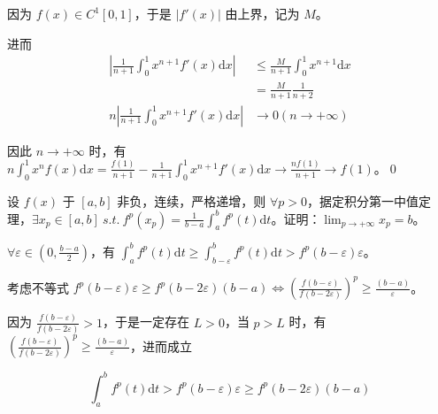 因为 $\displaystyle f( x) \in C^{1}[ 0,1]$，于是 $\displaystyle |f'( x) |$ 由上界，记为 $\displaystyle M$。

进而
\begin{align*}
	\left| \frac{1}{n+1}\int _{0}^{1} x^{n+1} f'( x)\mathrm{d} x\right|  & \leqslant \frac{M}{n+1}\int _{0}^{1} x^{n+1}\mathrm{d} x\\
	& =\frac{M}{n+1}\frac{1}{n+2}\\
	n\left| \frac{1}{n+1}\int _{0}^{1} x^{n+1} f'( x)\mathrm{d} x\right|  & \rightarrow 0\left( n\rightarrow +\infty \right)
\end{align*}


因此 $\displaystyle n\rightarrow +\infty $ 时，有 $\displaystyle n\int _{0}^{1} x^{n} f( x)\mathrm{d} x=\frac{f( 1)}{n+1} -\frac{1}{n+1}\int _{0}^{1} x^{n+1} f'( x)\mathrm{d} x\rightarrow \frac{nf( 1)}{n+1}\rightarrow f( 1)$。\qed 





\begin{ques}
	设 $\displaystyle f( x)$ 于 $\displaystyle [ a,b]$ 非负，连续，严格递增，则 $\displaystyle \forall p >0$，据定积分第一中值定理，$\displaystyle \exists x_{p} \in [ a,b] \ s.t.\ f^{p}( x_{p}) =\frac{1}{b-a}\int _{a}^{b} f^{p}( t)\mathrm{d} t$。证明：$\displaystyle \lim _{p\rightarrow +\infty } x_{p} =b$。
\end{ques}





$\displaystyle \forall \varepsilon \in \left( 0,\frac{b-a}{2}\right)$，有 $\displaystyle \int _{a}^{b} f^{p}( t)\mathrm{d} t\geqslant \int _{b-\varepsilon }^{b} f^{p}( t)\mathrm{d} t >f^{p}( b-\varepsilon ) \varepsilon $。

考虑不等式 $\displaystyle f^{p}( b-\varepsilon ) \varepsilon \geqslant f^{p}( b-2\varepsilon )( b-a) \Leftrightarrow \left(\frac{f( b-\varepsilon )}{f( b-2\varepsilon )}\right)^{p} \geqslant \frac{( b-a)}{\varepsilon }$。

因为 $\displaystyle \frac{f( b-\varepsilon )}{f( b-2\varepsilon )}  >1$，于是一定存在 $\displaystyle L >0$，当 $\displaystyle p >L$ 时，有 $\displaystyle \left(\frac{f( b-\varepsilon )}{f( b-2\varepsilon )}\right)^{p} \geqslant \frac{( b-a)}{\varepsilon }$，进而成立


\begin{equation*}
	\int _{a}^{b} f^{p}( t)\mathrm{d} t >f^{p}( b-\varepsilon ) \varepsilon \geqslant f^{p}( b-2\varepsilon )( b-a)
\end{equation*}


